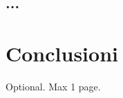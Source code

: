 \documentclass[12pt,a4paper,openright,twoside]{book}
\begin{document}
\section{...}

\chapter{Conclusioni}
\label{chap:conclusions}


\backmatter

\nocite{*} %


    

\begin{acknowledgements} %
Optional. Max 1 page.
\end{acknowledgements}
\end{document}
